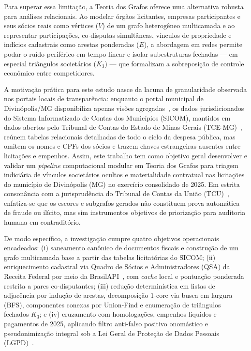 Para superar essa limitação, a Teoria dos Grafos oferece uma alternativa robusta para análises relacionais. Ao modelar órgãos licitantes, empresas participantes e seus sócios reais como vértices ($V$) de um grafo heterogêneo multicamada e ao representar participações, co-disputas simultâneas, vínculos de propriedade e indícios cadastrais como arestas ponderadas ($E$), a abordagem em redes permite podar o ruído periférico em tempo linear e isolar subestruturas fechadas — em especial triângulos societários ($K_3$) — que formalizam a sobreposição de controle econômico entre competidores.

A motivação prática para este estudo nasce da lacuna de granularidade observada nos portais locais de transparência: enquanto o portal municipal de Divinópolis/MG disponibiliza apenas visões agregadas~\cite{portal_transparencia_betha}, os dados jurisdicionados do Sistema Informatizado de Contas dos Municípios (SICOM), mantidos em dados abertos pelo Tribunal de Contas do Estado de Minas Gerais (TCE-MG)~\cite{tce_mg_dados_abertos,tcemg2025in01}, reúnem tabelas relacionais detalhadas de todo o ciclo da despesa pública, mas omitem os nomes e CPFs dos sócios e trazem chaves estrangeiras ausentes entre licitações e empenhos. Assim, este trabalho tem como objetivo geral desenvolver e validar um \textit{pipeline} computacional modular em Teoria dos Grafos para triagem indiciária de vínculos societários ocultos e materialidade contratual nas licitações do município de Divinópolis (MG) no exercício consolidado de 2025. Em estrita consonância com a jurisprudência do Tribunal de Contas da União (TCU)~\cite{tcu2011acordao2341,tcu2024acordao1798}, enfatiza-se que os escores e subgrafos gerados não constituem prova automática de fraude ou ilícito, mas sim instrumentos objetivos de priorização para auditoria humana em contraditório.

De modo específico, a investigação cumpre quatro objetivos operacionais encadeados: (i) saneamento canônico de documentos fiscais e construção de um grafo multicamada base a partir das tabelas licitatórias do SICOM; (ii) enriquecimento cadastral via Quadro de Sócios e Administradores (QSA) da Receita Federal por meio da BrasilAPI~\cite{brasilapi2026cnpj}, com \textit{cache} local e pontuação ponderada restrita a pares co-disputantes; (iii) redução determinística em listas de adjacência por indução de arestas, decomposição $1$-core via busca em largura (BFS), componentes conexas por Union-Find e enumeração de triângulos fechados $K_3$; e (iv) cruzamento com homologações, empenhos líquidos e pagamentos de 2025, aplicando filtro anti-falso positivo onomástico e pseudonimização integral sob a Lei Geral de Proteção de Dados Pessoais (LGPD)~\cite{brasil2018lgpd}.


